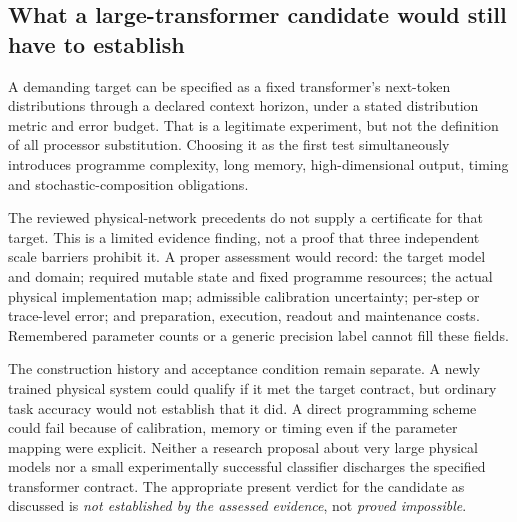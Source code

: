 \subsection{What a large-transformer candidate would still have to establish}\label{subsec:largeaudit}
A demanding target can be specified as a fixed transformer's next-token distributions through a declared context horizon, under a stated distribution metric and error budget. That is a legitimate experiment, but not the definition of all processor substitution. Choosing it as the first test simultaneously introduces programme complexity, long memory, high-dimensional output, timing and stochastic-composition obligations.

The reviewed physical-network precedents do not supply a certificate for that target. This is a limited evidence finding, not a proof that three independent scale barriers prohibit it. A proper assessment would record: the target model and domain; required mutable state and fixed programme resources; the actual physical implementation map; admissible calibration uncertainty; per-step or trace-level error; and preparation, execution, readout and maintenance costs. Remembered parameter counts or a generic precision label cannot fill these fields.

The construction history and acceptance condition remain separate. A newly trained physical system could qualify if it met the target contract, but ordinary task accuracy would not establish that it did. A direct programming scheme could fail because of calibration, memory or timing even if the parameter mapping were explicit. Neither a research proposal about very large physical models \citep{pfm} nor a small experimentally successful classifier discharges the specified transformer contract. The appropriate present verdict for the candidate as discussed is \emph{not established by the assessed evidence}, not \emph{proved impossible}.
